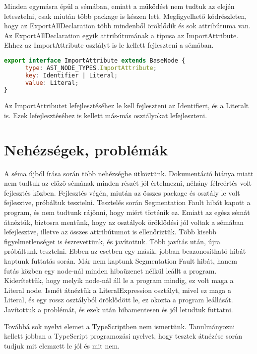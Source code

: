 Minden egymásra épül a sémában, emiatt a műkődést nem tudtuk az elején letesztelni, csak miután több package is készen lett.
Megfigyelhető  kódrészleten, hogy az ExportAllDeclaration több mindenből öröklődik és sok attribútuma van.
Az ExportAllDeclaration egyik attribútumának a típusa az ImportAttribute.
Ehhez az ImportAttribute osztályt is le kellett fejleszteni a sémában.

\begin{lstlisting}[caption={ImportAttribute},label={lst:asg_file_import_attribute}, language={JavaScript}]
export interface ImportAttribute extends BaseNode {
      type: AST_NODE_TYPES.ImportAttribute;
      key: Identifier | Literal;
      value: Literal;
}
\end{lstlisting}

Az ImportAttributet lefejlesztéséhez le kell fejleszteni az Identifiert, és a Literalt is.
Ezek lefejlesztéséhez is kellett más-más osztályokat lefejleszteni.

\noindent

\section{Nehézségek, problémák}

\noindent

A séma újból írása során több nehézségbe ütköztünk.
Dokumentáció hiánya miatt nem tudtuk az előző sémának minden részét jól értelmezni, néhány félreértés volt fejlesztés közben.
Fejlesztés végén, miután az összes package és osztály le volt fejlesztve, próbáltuk tesztelni.
Tesztelés során Segmentation Fault hibát kapott a program, és nem tudtunk rájönni, hogy miért történik ez.
Emiatt az egész sémát átnéztük, biztosra mentünk, hogy az osztályok öröklődési jól voltak a sémában lefejlesztve, illetve az összes attribútumot is ellenőriztük.
Több kisebb figyelmetlenséget is észrevettünk, és javítottuk.
Több javítás után, újra próbáltunk tesztelni. Ebben az esetben egy másik, jobban beazonosítható hibát kaptunk futtatás során.
Már nem kaptunk Segmentation Fault hibát, hanem futás közben egy node-nál minden hibaüzenet nélkül leállt a program.
Kiderítettük, hogy melyik node-nál áll le a program mindig, ez volt maga a Literal node.
Ismét átnéztük a LiteralExpression osztályt, mivel ez maga a Literal, és egy rossz osztályból öröklődött le, ez okozta a program leállását.
Javítottuk a problémát, és ezek után hibamentesen és jól letudtuk futtatni.

\noindent

Továbbá sok nyelvi elemet a TypeScriptben nem ismertünk.
Tanulmányozni kellett jobban a TypeScript programozási nyelvet, hogy tesztek átnézése során tudjuk mit elemzett le jól és mit nem.
